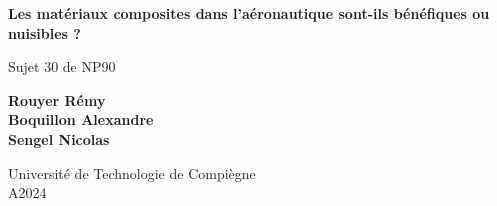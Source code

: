 
\begin{titlepage}
    \begin{center}
        \vspace*{1cm}

        \Huge
        \textbf{Les matériaux composites dans l'aéronautique sont-ils
        bénéfiques ou nuisibles ?}

        \vspace{0.5cm}
        \LARGE
        Sujet 30 de NP90
        \vspace{1.5cm}

        \textbf{Rouyer Rémy \\ Boquillon Alexandre \\ Sengel Nicolas}

        \vfill

        \vspace{1cm}
        \Large
        Université de Technologie de Compiègne\\
        A2024\\
        \vspace{1cm}
        


    \end{center}
\end{titlepage}
